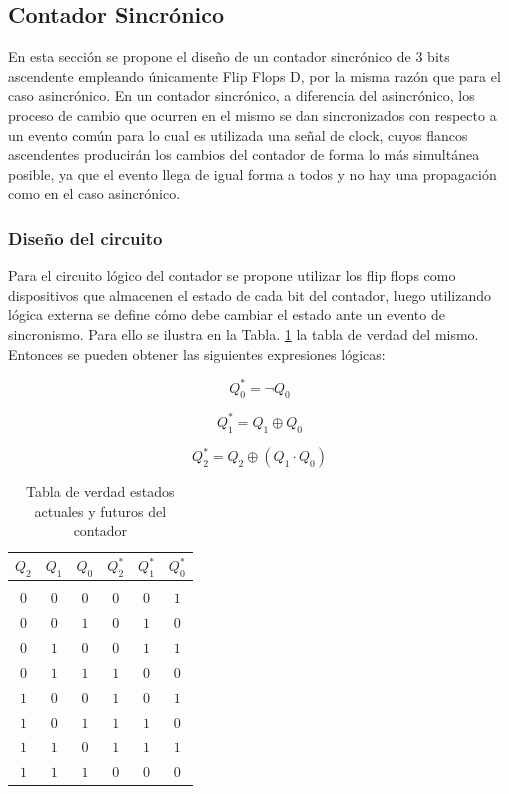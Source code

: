\subsection{Contador Sincr\'onico}
En esta secci\'on se propone el dise\~no de un contador sincr\'onico de 3 bits ascendente empleando \'unicamente Flip Flops D, por la misma raz\'on que para el caso asincr\'onico.
En un contador sincr\'onico, a diferencia del asincr\'onico, los proceso de cambio que ocurren en el mismo se dan sincronizados con respecto a un evento com\'un para lo cual es utilizada una se\~nal
de clock, cuyos flancos ascendentes producir\'an los cambios del contador de forma lo m\'as simult\'anea posible, ya que el evento llega de igual forma a todos y no hay una propagaci\'on como en el caso asincr\'onico.

\subsubsection{Dise\~no del circuito}
Para el circuito l\'ogico del contador se propone utilizar los flip flops como dispositivos que almacenen el estado de cada bit del contador,
luego utilizando l\'ogica externa se define c\'omo debe cambiar el estado ante un evento de sincronismo. Para ello se ilustra en la Tabla. \ref{table:tabla_verdad_contador}
la tabla de verdad del mismo. Entonces se pueden obtener las siguientes expresiones l\'ogicas:

\begin{equation}
    Q^{*}_0 = \neg Q_0 
\end{equation}

\begin{equation}
    Q^{*}_1 = Q_1 \oplus Q_0 
\end{equation}

\begin{equation}
    Q^{*}_2 = Q_2 \oplus (Q_1 \cdot Q_0) 
\end{equation}

\begin{table}[H]
    \centering
    \begin{tabular}{c c c | c c c}
        $Q_2$ & $Q_1$ & $Q_0$ & $Q^{*}_2$ & $Q^{*}_1$ & $Q^{*}_0$ \\ 
        \hline \\
        $0$ & $0$ & $0$ & $0$ & $0$ & $1$ \\
        $0$ & $0$ & $1$ & $0$ & $1$ & $0$ \\
        $0$ & $1$ & $0$ & $0$ & $1$ & $1$ \\
        $0$ & $1$ & $1$ & $1$ & $0$ & $0$ \\
        $1$ & $0$ & $0$ & $1$ & $0$ & $1$ \\
        $1$ & $0$ & $1$ & $1$ & $1$ & $0$ \\
        $1$ & $1$ & $0$ & $1$ & $1$ & $1$ \\
        $1$ & $1$ & $1$ & $0$ & $0$ & $0$ \\
    \end{tabular}
    \caption{Tabla de verdad estados actuales y futuros del contador}
    \label{table:tabla_verdad_contador}
\end{table}

